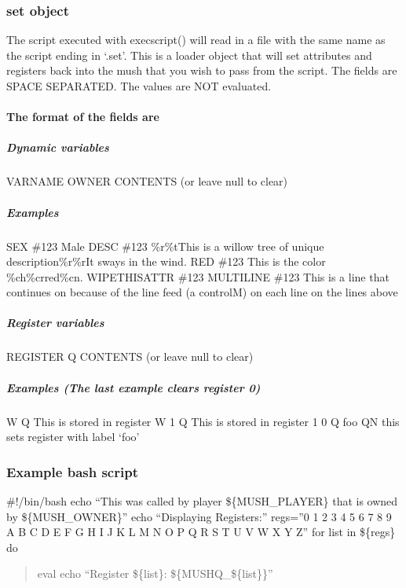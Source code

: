 \documentclass[letterpaper,10pt,english]{sphinxmanual}
\begin{document}
\subsubsection{set object}
\label{\detokenize{advanced:set-object}}
\sphinxAtStartPar
The script executed with execscript() will read in a file with the same name
as the script ending in ‘.set’.  This is a loader object that will set attributes
and registers back into the mush that you wish to pass from the script. The
fields are SPACE SEPARATED.  The values are NOT evaluated.


\paragraph{The format of the fields are}
\label{\detokenize{advanced:the-format-of-the-fields-are}}

\subparagraph{Dynamic variables}
\label{\detokenize{advanced:id67}}
\sphinxAtStartPar
VARNAME        OWNER        CONTENTS (or leave null to clear)


\subparagraph{Examples}
\label{\detokenize{advanced:examples}}
\sphinxAtStartPar
SEX \#123 Male
DESC \#123 \%r\%tThis is a willow tree of unique description\%r\%rIt sways in the wind.
RED \#123 This is the color \%ch\%crred\%cn.
WIPETHISATTR \#123
MULTILINE \#123 This is a line
that continues on
because of the line feed (a control\sphinxhyphen{}M) on each line
on the lines above


\subparagraph{Register variables}
\label{\detokenize{advanced:id68}}
\sphinxAtStartPar
REGISTER       Q            CONTENTS (or leave null to clear)


\subparagraph{Examples (The last example clears register 0)}
\label{\detokenize{advanced:examples-the-last-example-clears-register-0}}
\sphinxAtStartPar
W Q This is stored in register W
1 Q This is stored in register 1
0 Q
foo QN this sets register with label ‘foo’


\subsubsection{Example bash script}
\label{\detokenize{advanced:example-bash-script}}
\sphinxAtStartPar
\#!/bin/bash
echo “This was called by player \$\{MUSH\_PLAYER\} that is owned by \$\{MUSH\_OWNER\}”
echo “Displaying Registers:”
regs=”0 1 2 3 4 5 6 7 8 9 A B C D E F G H I J K L M N O P Q R S T U V W X Y Z”
for list in \$\{regs\}
do
\begin{quote}

\sphinxAtStartPar
eval echo “Register \$\{list\}: \$\{MUSHQ\_\$\{list\}\}”
\end{quote}
\end{document}
